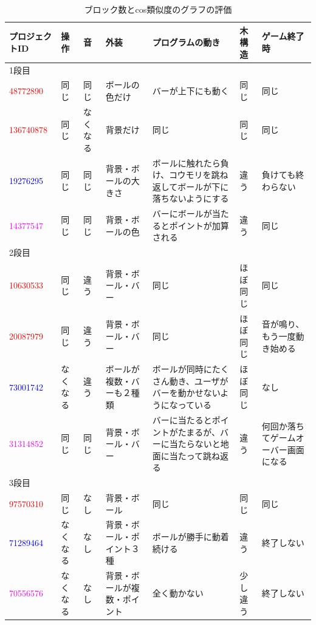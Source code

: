 \documentclass[a4paper,10pt,onecolumn,oneside,openany]{jsbook}
\begin{document}

\begin{table}[h]
 \scriptsize
 \caption{ブロック数とcos類似度のグラフの評価}
 \label{block}
 \begin{center}
\begin{tabular}{|p{1.7cm}||p{1cm}|p{1cm}|p{1.7cm}|p{2cm}|p{1cm}|p{1.7cm}|} \hline

プロジェクトID & 操作 & 音 & 外装 & プログラムの動き & 木構造 & ゲーム終了時 \\ \hline \hline
1段目 &  &  &  &  &  &  \\ \hline
\textcolor{red}{48772890} & 同じ & 同じ & ボールの色だけ & バーが上下にも動く & 同じ & 同じ \\ \hline
\textcolor{red}{136740878} & 同じ & なくなる & 背景だけ & 同じ & 同じ & 同じ \\ \hline
\textcolor{blue}{19276295} & 同じ & 同じ & 背景・ボールの大きさ & ボールに触れたら負け、コウモリを跳ね返してボールが下に落ちないようにする & 違う & 負けても終わらない \\ \hline
\textcolor{magenta}{14377547} & 同じ & 同じ & 背景・ボールの色 & バーにボールが当たるとポイントが加算される & 違う & 同じ \\ \hline

2段目 &  &  &  &  &  &  \\ \hline
\textcolor{red}{10630533} & 同じ & 違う & 背景・ボール・バー & 同じ & ほぼ同じ & 同じ \\ \hline
\textcolor{red}{20087979} & 同じ & 違う & 背景・ボール・バー & 同じ & ほぼ同じ & 音が鳴り、もう一度動き始める \\ \hline
\textcolor{blue}{73001742} & なくなる & 違う & ボールが複数・バーも２種類 & ボールが同時にたくさん動き、ユーザがバーを動かせないようになっている & ほぼ同じ & なし \\ \hline
\textcolor{magenta}{31314852} & 同じ & 同じ & 背景・ボール・バー & バーに当たるとポイントがたまるが、バーに当たらないと地面に当たって跳ね返る & 違う & 何回か落ちてゲームオーバー画面になる \\ \hline

3段目 &  &  &  &  &  &  \\ \hline
\textcolor{red}{97570310} & 同じ & なし & 背景・ボール & 同じ & 同じ & 同じ \\ \hline
\textcolor{blue}{71289464} & なくなる & なし & 背景・ボール・ポイント３種 & ボールが勝手に動着続ける & 違う & 終了しない \\ \hline
\textcolor{magenta}{70556576} & なくなる & なし & 背景・ボールが複数・ポイント & 全く動かない & 少し違う & 終了しない \\ \hline


\end{tabular}
\end{center}
\end{table}
\end{document}
